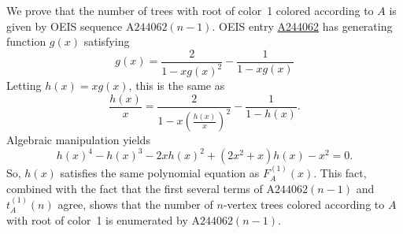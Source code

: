\documentclass[12pt]{amsart}
\newcommand{\seqnum}[1]{\href{https://oeis.org/#1}{#1}}
\newcommand{\gff}[2]{F_{#2}^{(#1)}(x)}
\newcommand{\gfa}[1]{\gff{#1}{A}}
\begin{document}
\begin{description}
\begin{itemize}
\end{itemize}
    \item[Discussion] We prove that the number of trees with root of color~1 colored according to $A$ is given by OEIS sequence $\text{A244062}(n-1)$.
    OEIS entry \seqnum{A244062} has generating function $g(x)$ satisfying
    \[
    g(x) = \frac{2}{1 - xg(x)^2} - \frac{1}{1 - xg(x)}
    \]
    Letting $h(x)=xg(x)$, this is the same as
    \[
    \frac{h(x)}{x} = \frac{2}{1 - x\left(\frac{h(x)}{x}\right)^2} - \frac{1}{1 - h(x)}.
    \]
    Algebraic manipulation yields
    \[
    h(x)^4-h(x)^3-2xh(x)^2+(2x^2 + x)h(x)-x^2=0.
    \]
    So, $h(x)$ satisfies the same polynomial equation as $\gfa{1}$. This fact, combined with the fact that the first several terms of $\text{A244062}(n-1)$ and $t_A^{(1)}(n)$ agree, shows that the number of $n$-vertex trees colored according to $A$ with root of color~1 is enumerated by $\text{A244062}(n-1)$.
\end{description}
\end{document}
